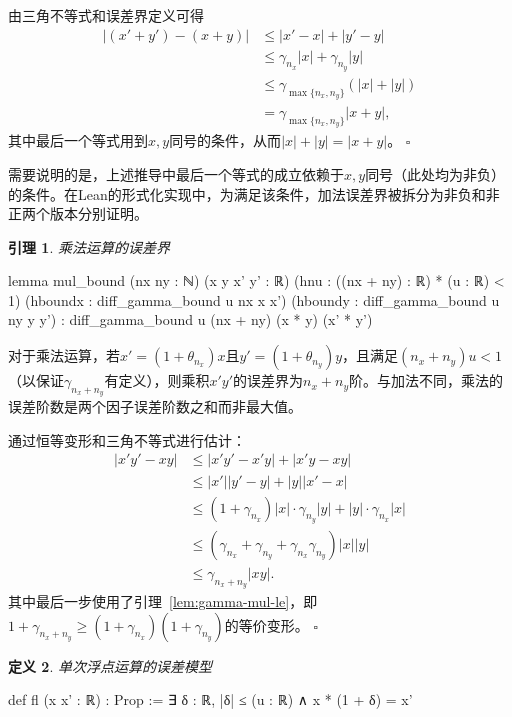 ﻿\documentclass[UTF8,a4paper,openany]{ctexbook}
\theoremstyle{qrplain}
\newtheorem{definition}{定义}[chapter]
\newtheorem{lemma}[definition]{引理}
{}
\renewenvironment{proof}[1][证明]
{\par\noindent{\qrthmchinese\bfseries #1. }\ignorespaces}
{\hfill$\square$\par}
\begin{document}
\begin{proof}
  由三角不等式和误差界定义可得
  \begin{align*}
    |(x' + y') - (x + y)| &\le |x' - x| + |y' - y| \\
    &\le \gamma_{n_x}|x| + \gamma_{n_y}|y| \\
    &\le \gamma_{\max\{n_x,n_y\}}(|x| + |y|)\\
    &= \gamma_{\max\{n_x,n_y\}}|x + y|,
  \end{align*}
  其中最后一个等式用到$x,y$同号的条件，从而$|x|+|y|=|x+y|$。
\end{proof}

需要说明的是，上述推导中最后一个等式的成立依赖于$x,y$同号（此处均为非负）的条件。在Lean的形式化实现中，为满足该条件，加法误差界被拆分为非负和非正两个版本分别证明。

\begin{lemma}
\label{lem:mul-bound}
  乘法运算的误差界
\end{lemma}
\begin{leancode}
  lemma mul_bound
    (nx ny : ℕ) (x y x' y' : ℝ)
    (hnu : ((nx + ny) : ℝ) * (u : ℝ) < 1)
    (hboundx : diff_gamma_bound u nx x x')
    (hboundy : diff_gamma_bound u ny y y') :
      diff_gamma_bound u (nx + ny) (x * y) (x' * y')
\end{leancode}

对于乘法运算，若$x'=(1+\theta_{n_x})x$且$y'=(1+\theta_{n_y})y$，且满足$(n_x+n_y)u<1$（以保证$\gamma_{n_x+n_y}$有定义），则乘积$x'y'$的误差界为$n_x+n_y$阶。与加法不同，乘法的误差阶数是两个因子误差阶数之和而非最大值。

\begin{proof}
  通过恒等变形和三角不等式进行估计：
  \begin{align*}
    |x'y' - xy| &\le |x'y' - x'y| + |x'y - xy| \\
    &\le |x'||y' - y| + |y||x' - x| \\
    &\le (1 + \gamma_{n_x})|x|\cdot\gamma_{n_y}|y| + |y|\cdot\gamma_{n_x}|x| \\
    &\le (\gamma_{n_x} + \gamma_{n_y} + \gamma_{n_x}\gamma_{n_y})|x||y|\\
    &\le \gamma_{n_x + n_y}|xy|.
  \end{align*}
  其中最后一步使用了引理~\ref{lem:gamma-mul-le}，即$1+\gamma_{n_x+n_y}\ge(1+\gamma_{n_x})(1+\gamma_{n_y})$的等价变形。
\end{proof}

\begin{definition}
\label{def:fl}
  单次浮点运算的误差模型
\end{definition}
\begin{leancode}
  def fl (x x' : ℝ) : Prop :=
    ∃ δ : ℝ, |δ| ≤ (u : ℝ) ∧ x * (1 + δ) = x'
\end{leancode}
\end{document}

